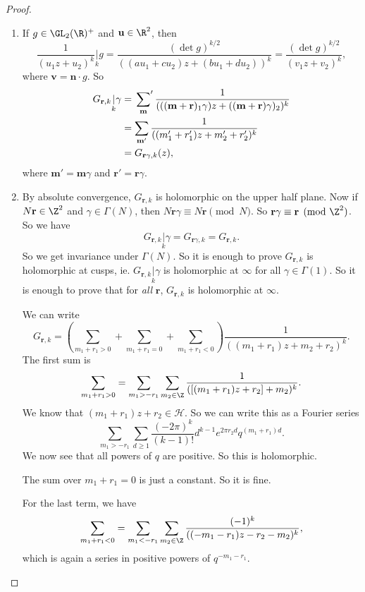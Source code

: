 \documentclass[a4paper]{article}
\renewcommand{\H}{\mathcal{H}}
\begin{document}
\begin{proof}\leavevmode
  \begin{enumerate}
    \item If $g \in \GL_2(\R)^+$ and $\mathbf{u} \in \R^2$, then
      \[
        \frac{1}{(u_1 z + u_2)^k} \underset{k}{|} g = \frac{(\det g)^{k/2}}{ ((au_1 + cu_2) z + (bu_1 + d u_2))^k} = \frac{(\det g)^{k/2}}{(v_1 z + v_2)^k},
      \]
      where $\mathbf{v} = \mathbf{n}\cdot g$. So
      \begin{align*}
        G_{\mathbf{r}, k} \underset{k}{|}\gamma &= \sideset{}{'}\sum_{\mathbf{m}}\frac{1}{(((\mathbf{m} + \mathbf{r})_1 \gamma) z + ((\mathbf{m} + \mathbf{r})\gamma)_2)^k} \\
        &= \sum_{\mathbf{m}'} \frac{1}{((m_1' + r_1') z + m_2' + r_2')^k}\\
        &= G_{\mathbf{r} \gamma, k}(z),
      \end{align*}
      where $\mathbf{m}' = \mathbf{m} \gamma$ and $\mathbf{r}' = \mathbf{r} \gamma$.
    \item By absolute convergence, $G_{\mathbf{r}, k}$ is holomorphic on the upper half plane. Now if $N\mathbf{r} \in \Z^2$ and $\gamma \in \Gamma(N)$, then $N\mathbf{r} \gamma \equiv N\mathbf{r} \pmod N$. So $\mathbf{r} \gamma \equiv \mathbf{r} \pmod {\Z^2}$. So we have
      \[
        G_{\mathbf{r}, k}\underset{k}{|}\gamma = G_{\mathbf{r} \gamma, k} = G_{\mathbf{r}, k}.
      \]
      So we get invariance under $\Gamma(N)$. So it is enough to prove $G_{\mathbf{r}, k}$ is holomorphic at cusps, ie. $G_{\mathbf{r}, k}\underset{k}{|} \gamma$ is holomorphic at $\infty$ for all $\gamma \in \Gamma(1)$. So it is enough to prove that for \emph{all} $\mathbf{r}$, $G_{\mathbf{r}, k}$ is holomorphic at $\infty$.

      We can write
      \[
        G_{\mathbf{r}, k} = \left(\sum_{m_1 + r_1 > 0} + \sum_{m_1 + r_1 = 0} + \sum_{m_1 + r_1 < 0}\right)\frac{1}{((m_1 + r_1) z + m_2 + r_2)^k}.
      \]
      The first sum is
      \[
        \sum_{m_1 + r_1 > 0} = \sum_{m_1 > - r_1} \sum_{m_2 \in \Z} \frac{1}{([(m_1 + r_1) z + r_2] + m_2)^k}.
      \]
      We know that $(m_1 + r_1)z + r_2 \in \H$. So we can write this as a Fourier series
      \[
        \sum_{m_1 > -r_1} \sum_{d \geq 1} \frac{(-2\pi)^k}{(k - 1)!} d^{k - 1} e^{2\pi r_2 d} q^{(m_1 + r_1) d}.
      \]
      We now see that all powers of $q$ are positive. So this is holomorphic.

      The sum over $m_1 + r_1 = 0$ is just a constant. So it is fine.

      For the last term, we have
      \[
        \sum_{m_1 + r_1 < 0} = \sum_{m_1 < - r_1} \sum_{m_2 \in \Z} \frac{(-1)^k}{((-m_1 - r_1)z - r_2 - m_2)^k},
      \]
      which is again a series in positive powers of $q^{-m_1 - r_1}$.
  \end{enumerate}
\end{proof}
\end{document}
